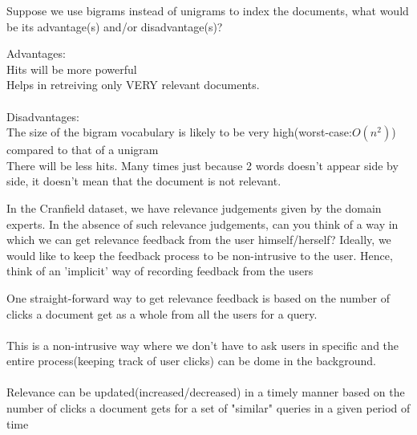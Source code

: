 \documentclass[11pt]{exam}
\begin{document}
\begin{questions}
\begin{solution}
\end{solution}
\question Suppose we use bigrams instead of unigrams to index the documents, what would be its
advantage(s) and/or disadvantage(s)?
\begin{solution}
    Advantages:\\
    Hits will be more powerful\\
    Helps in retreiving only VERY relevant documents.\\\\
    Disadvantages:\\
    The size of the bigram vocabulary is likely to be very high(worst-case:$O(n^2)$) compared to that of a unigram\\
    There will be less hits. Many times just because 2 words doesn't appear side by side, it doesn't mean that the document is not relevant.\\
\end{solution}

\question In the Cranfield dataset, we have relevance judgements given by the domain experts.
In the absence of such relevance judgements, can you think of a way in which we can
get relevance feedback from the user himself/herself? Ideally, we would like to keep the
feedback process to be non-intrusive to the user. Hence, think of an ’implicit’ way of
recording feedback from the users

\begin{solution}
    One straight-forward way to get relevance feedback is based on the number of clicks a document get as a whole from all the users for a query.\\\\
    This is a non-intrusive way where we don't have to ask users in specific and the entire process(keeping track of user clicks) can be dome in the background.\\\\
    Relevance can be updated(increased/decreased) in a timely manner based on the number of clicks a document gets for a set of "similar" queries in a given period of time
\end{solution}
\end{questions}
\end{document}
